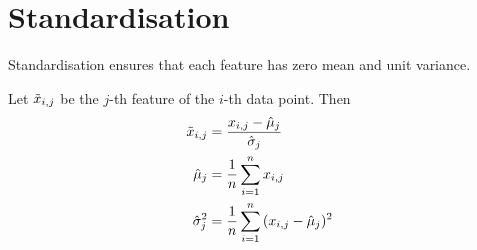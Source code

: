 \section{Standardisation}
Standardisation ensures that each feature has
zero mean and unit variance.

Let $\Tilde{x}_{i,j}$ be the $j$-th feature of
the $i$-th data point. Then
\begin{align*}
    \Tilde{x}_{i,j} &= \frac{x_{i,j} - \hat{\mu}_j}{\hat{\sigma}_j} \\
    \hat{\mu}_j &= \frac{1}{n} \sum_{i=1}^n{x_{i,j}} \\
    \hat{\sigma}_j^2 &= \frac{1}{n} \sum_{i=1}^n{(x_{i,j} - \hat{\mu}_j)^2}
\end{align*}
